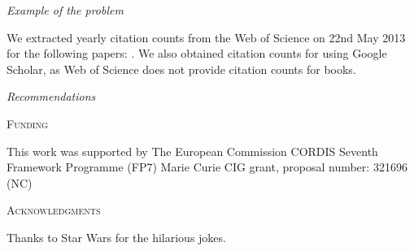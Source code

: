 \documentclass[a4paper,12pt]{article}
\renewcommand{\section}[1]{%
\bigskip
\begin{center}
\begin{Large}
\normalfont\scshape #1
\medskip
\end{Large}
\end{center}}
\renewcommand{\subsection}[1]{%
\bigskip
\begin{center}
\begin{large}
\normalfont\itshape #1
\end{large}
\end{center}}
\begin{document}
\subsection{Example of the problem}

We extracted yearly citation counts from the Web of Science on 22nd May 2013 for the following papers: \citet{diaz1996testing,felsenstein1988phylogenies,felsenstein1985phylogenies,freckleton2000phylogenetic,freckleton2002phylogenetic,freckleton2006detecting,grafen1989phylogenetic,garland1992procedures,hansen1996translating,hansen2005assessing,jones1997optimum,garland2000using,garland1992rate,martins1997phylogenies,price1997correlated,rohle2006comment,ricklefs1996applications,rohlf2001comparative,schluter1997likelihood,westoby1995misinterpreting,westoby1995further}. We also obtained citation counts for \citet{harvey1991comparative} using Google Scholar, as Web of Science does not provide citation counts for books.

\subsection{Recommendations}


\section{Funding}
This work was supported by The European Commission CORDIS Seventh Framework Programme (FP7) Marie Curie CIG grant, proposal number: 321696 (NC)

\section{Acknowledgments}
Thanks to Star Wars for the hilarious jokes.



\end{document}

